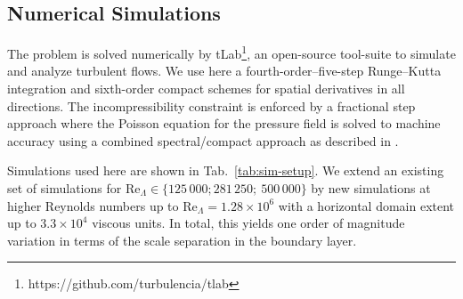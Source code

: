 \documentclass[smallcondensed,final]{svjour3}
\newcommand{\RE}{\mathrm{Re}}
\begin{document}
\subsection{Numerical Simulations}
The problem is solved numerically by tLab\footnote{https://github.com/turbulencia/tlab},
an open-source tool-suite to simulate and analyze turbulent flows.
% 
We use here a fourth-order--five-step Runge--Kutta integration and sixth-order compact schemes
for spatial derivatives in all directions.
%
The incompressibility constraint is enforced by a fractional step approach where the Poisson equation
for the pressure field is solved to machine accuracy using a combined spectral/compact approach as
described in \citet{mellado:ZaM2012}.
%
\par
%
Simulations used here are shown in Tab.~\ref{tab:sim-setup}.
%
We extend an existing set of simulations for $\RE_\Lambda\in\{125\,000; 281\,250;\ 500\,000\}$ \citep[gray shading; cf.][]{ansorge:BM2014,ansorge:JFM2016} 
by new simulations at higher Reynolds numbers up to $\RE_\Lambda=1.28\times10^6$ with a horizontal domain extent up to $3.3\times 10^4$ viscous units. 
%
In total, this yields one order of magnitude variation in terms of the scale separation in the boundary layer.
%
\end{document}

